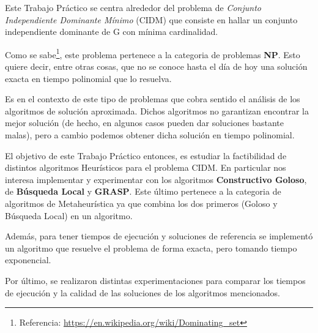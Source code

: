 Este Trabajo Práctico se centra alrededor del problema de \textit{Conjunto Independiente Dominante Mínimo} (CIDM) que consiste en hallar un conjunto
independiente dominante de G con mínima cardinalidad.

Como se sabe\footnote{Referencia: \url{https://en.wikipedia.org/wiki/Dominating_set}}, este problema pertenece a la categoria de problemas \textbf{NP}. Esto quiere decir, entre otras cosas, que no se conoce hasta el día de hoy una solución exacta en tiempo polinomial que lo resuelva.

Es en el contexto de este tipo de problemas que cobra sentido el análisis de los algoritmos de solución aproximada. Dichos algoritmos no garantizan encontrar la mejor solución (de hecho, en algunos casos pueden dar soluciones bastante malas), pero a cambio podemos obtener dicha solución en tiempo polinomial.

El objetivo de este Trabajo Práctico entonces, es estudiar la factibilidad de distintos algoritmos Heurísticos para el problema CIDM. En particular nos interesa implementar y experimentar con los algoritmos \textbf{Constructivo Goloso}, de \textbf{Búsqueda Local} y \textbf{GRASP}. Este último pertenece a la categoria de algoritmos de Metaheurística ya que combina los dos primeros (Goloso y Búsqueda Local) en un algoritmo.

Además, para tener tiempos de ejecución y soluciones de referencia se implementó un algoritmo que resuelve el problema de forma exacta, pero tomando tiempo exponencial.

Por último, se realizaron distintas experimentaciones para comparar los tiempos de ejecución y la calidad de las soluciones de los algoritmos mencionados.
